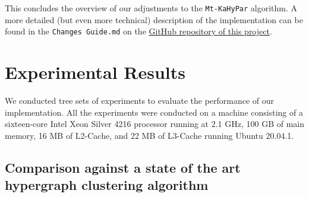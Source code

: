 \documentclass[acmsmall,nonacm,screen,review]{acmart}
\begin{document}
\medskip
This concludes the overview of our adjustments to the \texttt{Mt-KaHyPar} algorithm.
A more detailed (but even more technical) description of the implementation can be 
found in the \texttt{Changes Guide.md} on the
\hyperlink{https://github.com/mme-stud/iap_mt_kahypar}{GitHub repository of this project}.

\section{Experimental Results}
\label{sec:experiments}

We conducted tree sets of experiments to evaluate the performance of our
implementation. All the experiments were conducted on a machine consisting 
of a sixteen-core Intel Xeon Silver 4216 processor running at 2.1 GHz, 
100 GB of main memory, 16 MB of L2-Cache, and 22 MB of L3-Cache running 
Ubuntu 20.04.1.

\subsection{Comparison against a state of the art hypergraph clustering algorithm}
\end{document}
